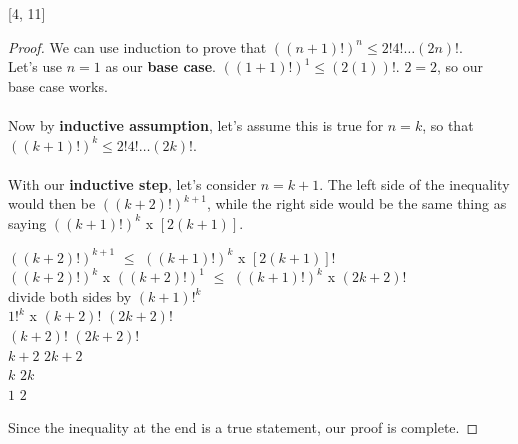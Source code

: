 \documentclass[12pt,letterpaper]{exam}
\begin{document}
[4, 11]
\begin{proof}
We can use induction to prove that $((n+1)!)^n \leq 2!4! \ldots (2n)!$.\\
Let's use $n=1$ as our \textbf{base case}. $((1+1)!)^1 \leq (2(1))!$. $2 = 2$, so our base case works.\\\\
Now by \textbf{inductive assumption}, let's assume this is true for $n=k$, so that $((k+1)!)^k \leq 2!4! \ldots (2k)!$.\\\\
With our \textbf{inductive step}, let's consider $n=k+1$. The left side of the inequality would then be $((k+2)!)^{k+1}$, while the right side would be the same thing as saying $((k+1)!)^k$ x $[2(k+1)]$.
\begin{center} $((k+2)!)^{k+1}$  $\leq$  $((k+1)!)^k$ x $[2(k+1)]!$\\
$((k+2)!)^{k}$ x $((k+2)!)^1$  $\leq$  $((k+1)!)^k$ x $(2k+2)!$\\
divide both sides by $(k+1)!^k$\\
$1!^k$ x $(k+2)!$  \leq  $(2k+2)!$\\
$(k+2)!$  \leq  $(2k+2)!$\\
$k+2$  \leq  $2k+2$\\
$k$  \leq  $2k$\\
$1$  \leq  $2$\\
\end{center}

Since the inequality at the end is a true statement, our proof is complete.

\end{proof}\\
\end{document}
